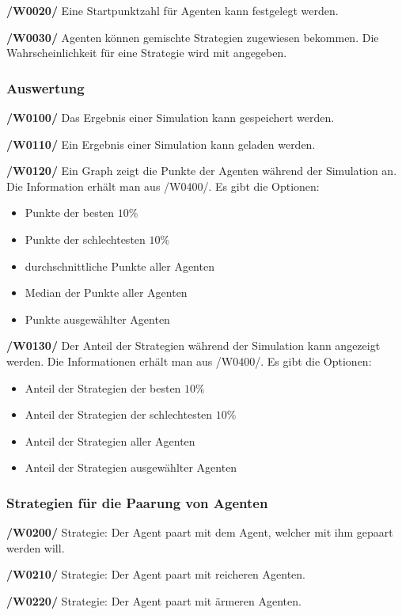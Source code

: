 \textbf{/W0020/}
Eine Startpunktzahl für Agenten kann festgelegt werden.

\textbf{/W0030/}
Agenten können gemischte Strategien zugewiesen bekommen. Die Wahrscheinlichkeit für eine Strategie wird mit angegeben.

\subsubsection{Auswertung}

\textbf{/W0100/}
Das Ergebnis einer Simulation kann gespeichert werden.

\textbf{/W0110/}
Ein Ergebnis einer Simulation kann geladen werden.

\textbf{/W0120/}
Ein Graph zeigt die Punkte der Agenten während der Simulation an. Die Information erhält man aus /W0400/. Es gibt die Optionen:
\begin{itemize}
\item Punkte der besten $10\%$
\item Punkte der schlechtesten $10\%$
\item durchschnittliche Punkte aller Agenten
\item Median der Punkte aller Agenten
\item Punkte ausgewählter Agenten
\end{itemize}

\textbf{/W0130/}
Der Anteil der Strategien während der Simulation kann angezeigt werden. Die Informationen erhält man aus /W0400/. Es gibt die Optionen:
\begin{itemize}
\item Anteil der Strategien der besten $10\%$
\item Anteil der Strategien der schlechtesten $10\%$
\item Anteil der Strategien aller Agenten
\item Anteil der Strategien ausgewählter Agenten
\end{itemize}

\subsubsection{Strategien für die Paarung von Agenten}

\textbf{/W0200/}
Strategie: Der Agent paart mit dem Agent, welcher mit ihm gepaart werden will.

\textbf{/W0210/} 
Strategie: Der Agent paart mit reicheren Agenten.

\textbf{/W0220/}
Strategie: Der Agent paart mit ärmeren Agenten.

